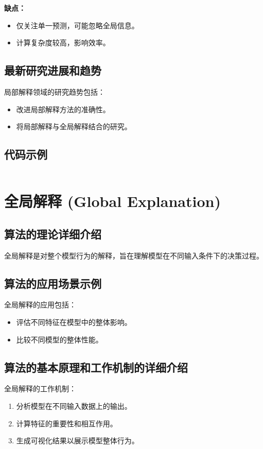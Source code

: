 \textbf{缺点：}
\begin{itemize}
    \item 仅关注单一预测，可能忽略全局信息。
    \item 计算复杂度较高，影响效率。
\end{itemize}

\subsection*{最新研究进展和趋势}
局部解释领域的研究趋势包括：
\begin{itemize}
    \item 改进局部解释方法的准确性。
    \item 将局部解释与全局解释结合的研究。
\end{itemize}
\subsection*{代码示例}
\begin{lstlisting}

\end{lstlisting}


\section{全局解释 (Global Explanation)}
\subsection*{算法的理论详细介绍}
全局解释是对整个模型行为的解释，旨在理解模型在不同输入条件下的决策过程。

\subsection*{算法的应用场景示例}
全局解释的应用包括：
\begin{itemize}
    \item 评估不同特征在模型中的整体影响。
    \item 比较不同模型的整体性能。
\end{itemize}

\subsection*{算法的基本原理和工作机制的详细介绍}
全局解释的工作机制：
\begin{enumerate}
    \item 分析模型在不同输入数据上的输出。
    \item 计算特征的重要性和相互作用。
    \item 生成可视化结果以展示模型整体行为。
\end{enumerate}

